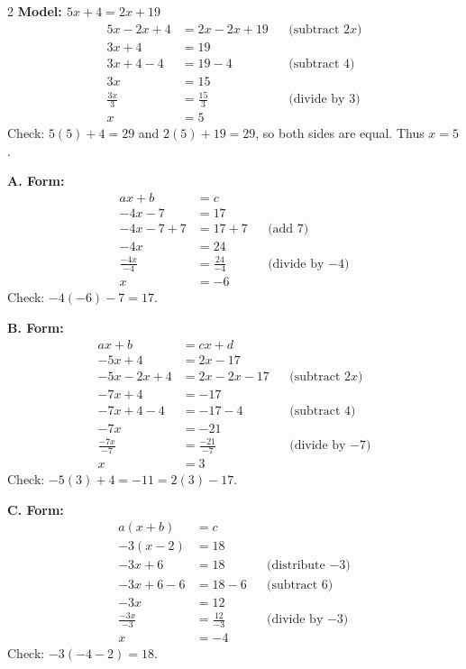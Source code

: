 \begin{multicols}{2}
		\textbf{Model: \quad $5x+4=2x+19$}
		\vspace{-2mm}
		\begin{align*}
			5x-2x+4&=2x-2x+19 &&\text{(subtract $2x$)}\\
			3x+4&=19\\
			3x+4-4&=19-4 &&\text{(subtract 4)}\\
			3x&=15\\
			\frac{3x}{3}&=\frac{15}{3} &&\text{(divide by 3)}\\
			x&=5
		\end{align*}
		Check: $5(5)+4=29$ and $2(5)+19=29$, so both sides are equal. Thus $x=5$.
		
		
		\textbf{A. Form:}
		\vspace{-7mm}
		\begin{align*}
			ax+b&=c \\ 
			-4x-7&=17 \\
			-4x-7+7&=17+7 &&\text{(add 7)}\\
			-4x&=24\\
			\frac{-4x}{-4}&=\frac{24}{-4} &&\text{(divide by $-4$)}\\
			x&=-6
		\end{align*}
		\vspace{-4mm}
		Check: $-4(-6)-7=17$.
		\vspace{5mm}
		
		\textbf{B. Form:}
		\vspace{-7mm}
		\begin{align*}
			ax+b&=cx+d \\
			-5x+4&=2x-17 \\
			-5x-2x+4&=2x-2x-17 &&\text{(subtract $2x$)}\\
			-7x+4&=-17\\
			-7x+4-4&=-17-4 &&\text{(subtract 4)}\\
			-7x&=-21\\
			\frac{-7x}{-7}&=\frac{-21}{-7} &&\text{(divide by $-7$)}\\
			x&=3
		\end{align*}
		\vspace{-4mm}
		Check: $-5(3)+4=-11=2(3)-17$.
		\vspace{5mm}
		
		\textbf{C. Form:}
		\vspace{-7mm}
		\begin{align*}
			a(x+b)&=c \\
			-3(x-2)&=18 \\
			-3x+6&=18 &&\text{(distribute $-3$)}\\
			-3x+6-6&=18-6 &&\text{(subtract 6)}\\
			-3x&=12\\
			\frac{-3x}{-3}&=\frac{12}{-3} &&\text{(divide by $-3$)}\\
			x&=-4
		\end{align*}
		\vspace{-4mm}
		Check: $-3(-4-2)=18$.
		\vspace{5mm}
		

\end{multicols}
